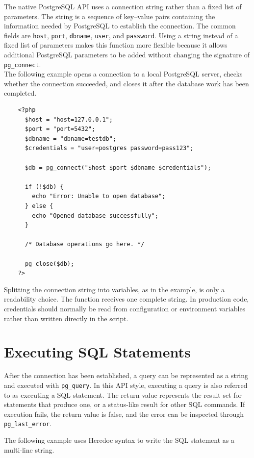 \documentclass{scrbook}
\begin{document}
	The native PostgreSQL API uses a connection string rather than a fixed list of parameters. The string is a sequence of key--value pairs containing the information needed by PostgreSQL to establish the connection. The common fields are \texttt{host}, \texttt{port}, \texttt{dbname}, \texttt{user}, and \texttt{password}. Using a string instead of a fixed list of parameters makes this function more flexible because it allows additional PostgreSQL parameters to be added without changing the signature of \texttt{pg\_connect}.\\
	
	The following example opens a connection to a local PostgreSQL server, checks whether the connection succeeded, and closes it after the database work has been completed.
	
	\begin{lstlisting}
	<?php
	  $host = "host=127.0.0.1";
	  $port = "port=5432";
	  $dbname = "dbname=testdb";
	  $credentials = "user=postgres password=pass123";
	
	  $db = pg_connect("$host $port $dbname $credentials");
	
	  if (!$db) {
		echo "Error: Unable to open database";
	  } else {
		echo "Opened database successfully";
	  }
	
	  /* Database operations go here. */
	  
	  pg_close($db);
	?>
	\end{lstlisting}
	
	Splitting the connection string into variables, as in the example, is only a readability choice. The function receives one complete string. In production code, credentials should normally be read from configuration or environment variables rather than written directly in the script.
	
	\section{Executing SQL Statements}
	
	After the connection has been established, a query can be represented as a string and executed with \texttt{pg\_query}. In this API style, executing a query is also referred to as executing a SQL statement. The return value represents the result set for statements that produce one, or a status-like result for other SQL commands. If execution fails, the return value is false, and the error can be inspected through \texttt{pg\_last\_error}.
	
	The following example uses Heredoc syntax to write the SQL statement as a multi-line string.
	
\end{document}
